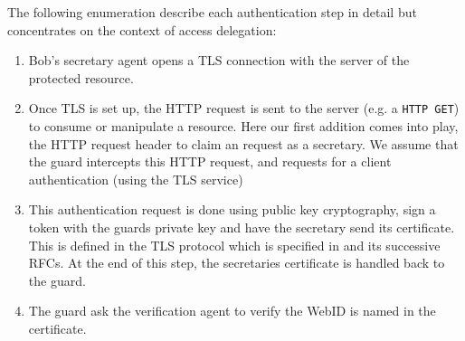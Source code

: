 \documentclass[a4paper]{llncs}
\begin{document}
The following enumeration describe each authentication step in detail but concentrates on the context of access delegation:

\begin{enumerate}
    \item Bob's secretary agent opens a TLS connection with the server of the protected resource.
    \item Once TLS is set up, the HTTP request is sent to the server (e.g. a \verb!HTTP GET!) to consume or manipulate a resource.
        Here our first addition comes into play, the HTTP request header to claim an request as a secretary.
        We assume that the guard intercepts this HTTP request, and requests for a client authentication (using the TLS service)
    \item This authentication request is done using public key cryptography, sign a token with the guards private key and have the secretary send its certificate.
        This is defined in the TLS protocol which is specified in \cite{dierks-t-2012--a} and its successive RFCs.
        At the end of this step, the secretaries certificate is handled back to the guard.
    \item The guard ask the verification agent to verify the WebID is named in the certificate.


\end{enumerate}
\end{document}
